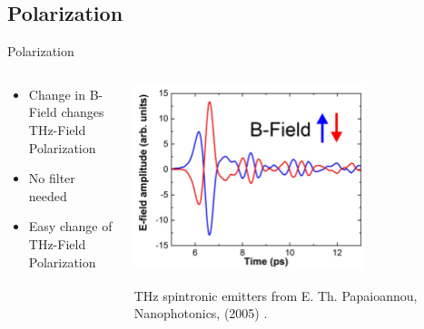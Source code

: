 \documentclass[aspectratio=1610, 9pt]{beamer}
\begin{document}
\subsection{Polarization}
\begin{frame}{Polarization}
  \begin{columns}
    \begin{column}{0.3\textwidth}
    \begin{itemize}
      \item Change in B-Field changes THz-Field Polarization
      \vspace{0.3in}
      \item No filter needed
      \vspace{0.3in}
      \item Easy change of THz-Field Polarization
    \end{itemize}
    \end{column}
  \begin{column}{.7\textwidth}
  \begin{center}
    \includegraphics[width=0.7\textwidth]{pics/Bfeld.png}
  \end{center}
    \vspace{0.2in}
    \hspace{0.2in}
    \small{\textcolor{tugreen}{THz spintronic emitters} from E. Th. Papaioannou, Nanophotonics, (2005) .}
  \end{column}
  \end{columns}
\end{frame}
\end{document}
